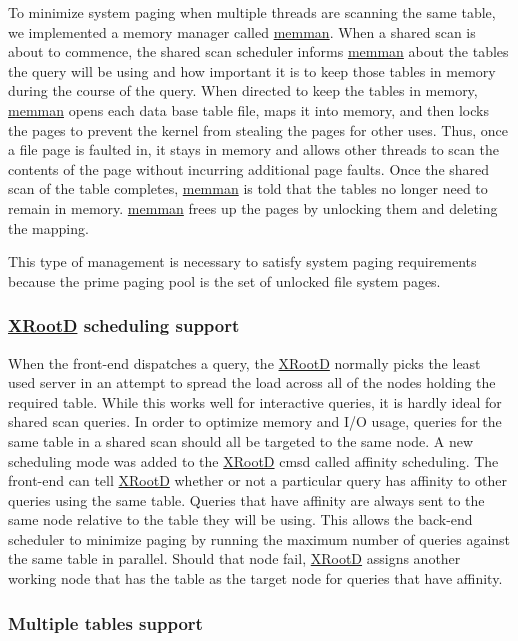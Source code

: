 \documentclass[DM,lsstdraft,toc]{lsstdoc}
\begin{document}
To minimize system paging when multiple threads are scanning the same
table, we implemented a memory manager called \href{}{memman}. When a
shared scan is about to commence, the shared scan scheduler informs
\href{}{memman} about the tables the query will be using and how
important it is to keep those tables in memory during the course of the
query. When directed to keep the tables in memory, \href{}{memman} opens
each data base table file, maps it into memory, and then locks the pages
to prevent the kernel from stealing the pages for other uses. Thus, once
a file page is faulted in, it stays in memory and allows other threads
to scan the contents of the page without incurring additional page
faults. Once the shared scan of the table completes, \href{}{memman} is
told that the tables no longer need to remain in memory. \href{}{memman}
frees up the pages by unlocking them and deleting the mapping.

This type of management is necessary to satisfy system paging
requirements because the prime paging pool is the set of unlocked file
system pages.

\subsubsection{\texorpdfstring{\href{http://xrootd.org}{XRootD}
scheduling
support}{XRootD scheduling support}}\label{shared-scan-xrootd-scheduling-support}

When the front-end dispatches a query, the
\href{http://xrootd.org}{XRootD} normally picks the least used server in
an attempt to spread the load across all of the nodes holding the
required table. While this works well for interactive queries, it is
hardly ideal for shared scan queries. In order to optimize memory and
I/O usage, queries for the same table in a shared scan should all be
targeted to the same node. A new scheduling mode was added to the
\href{http://xrootd.org}{XRootD} cmsd called affinity scheduling. The
front-end can tell \href{http://xrootd.org}{XRootD} whether or not a
particular query has affinity to other queries using the same table.
Queries that have affinity are always sent to the same node relative to
the table they will be using. This allows the back-end scheduler to
minimize paging by running the maximum number of queries against the
same table in parallel. Should that node fail,
\href{http://xrootd.org}{XRootD} assigns another working node that has
the table as the target node for queries that have affinity.

\subsubsection{Multiple tables support}\label{shared-scan-multiple-tables-support}
\end{document}
